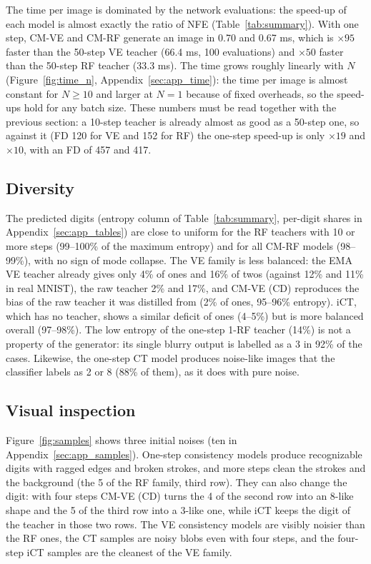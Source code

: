 \documentclass{article}
\begin{document}
The time per image is dominated by the network evaluations: the speed-up of
each model is almost exactly the ratio of NFE (Table~\ref{tab:summary}). With
one step, CM-VE and CM-RF generate an image in 0.70 and 0.67 ms, which is
$\times 95$ faster than the 50-step VE teacher (66.4 ms, 100 evaluations) and
$\times 50$ faster than the 50-step RF teacher (33.3 ms). The time grows
roughly linearly with $N$ (Figure~\ref{fig:time_n}, Appendix~\ref{sec:app_time}): the time per image is almost
constant for $N \geq 10$ and larger at $N = 1$ because of fixed overheads, so
the speed-ups hold for any batch size. These numbers must be read together
with the previous section: a 10-step teacher is already almost as good as a
50-step one, so against it (FD 120 for VE and 152 for RF) the one-step
speed-up is only $\times 19$ and $\times 10$, with an FD of 457 and 417.

\subsection{Diversity}

The predicted digits (entropy column of Table~\ref{tab:summary}, per-digit
shares in Appendix~\ref{sec:app_tables}) are close to uniform for the RF
teachers with 10 or more steps (99--100\% of the maximum entropy) and for all
CM-RF models (98--99\%), with no sign of mode collapse. The VE family is less
balanced: the EMA VE teacher already gives only 4\% of ones and 16\% of twos
(against 12\% and 11\% in real MNIST), the raw teacher 2\% and 17\%, and CM-VE
(CD) reproduces the bias of the raw teacher it was distilled from (2\% of ones,
95--96\% entropy). iCT, which has no teacher, shows a similar deficit of ones
(4--5\%) but is more balanced overall (97--98\%). The low entropy of the
one-step 1-RF teacher (14\%) is not a property of the generator: its single
blurry output is labelled as a 3 in 92\% of the cases. Likewise, the one-step
CT model produces noise-like images that the classifier labels as 2 or 8 (88\%
of them), as it does with pure noise.

\subsection{Visual inspection}

Figure~\ref{fig:samples} shows three initial noises (ten in
Appendix~\ref{sec:app_samples}). One-step consistency models produce
recognizable digits with ragged edges and broken strokes, and more steps clean
the strokes and the background (the 5 of the RF family, third row). They can
also change the digit: with four steps CM-VE (CD) turns the 4 of the second row
into an 8-like shape and the 5 of the third row into a 3-like one, while iCT keeps
the digit of the teacher in those two rows. The VE consistency models are visibly noisier
than the RF ones, the CT samples are noisy blobs even with four steps, and the
four-step iCT samples are the cleanest of the VE family.
\end{document}
